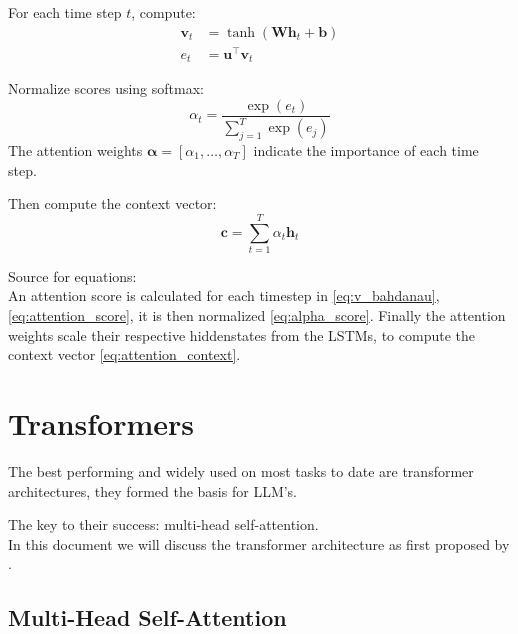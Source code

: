 \documentclass{article}
\begin{document}
For each time step $t$, compute:
\begin{align}
    \mathbf{v}_t &= \tanh\!\left( \mathbf{W} \mathbf{h}_t + \mathbf{b} \right) \label{eq:v_bahdanau} \\
    e_t &= \mathbf{u}^\top \mathbf{v}_t \label{eq:attention_score}
\end{align}

Normalize scores using softmax:
\begin{equation}
    \alpha_t = \frac{\exp(e_t)}{\sum_{j=1}^{T} \exp(e_j)} \label{eq:alpha_score}
\end{equation}
The attention weights $\boldsymbol{\alpha} = [\alpha_1, \dots, \alpha_T]$ 
indicate the importance of each time step.

Then compute the context vector:
\begin{equation}
    \mathbf{c} = \sum_{t=1}^{T} \alpha_t \mathbf{h}_t \label{eq:attention_context}
\end{equation}

Source for equations: \cite{cristina_2023_bahdanau}
\\[2em]
An attention score is calculated for each timestep in \eqref{eq:v_bahdanau}, 
\eqref{eq:attention_score}, it is then normalized \eqref{eq:alpha_score}. 
Finally the attention weights scale their respective hiddenstates from the 
LSTMs, to compute the context vector \eqref{eq:attention_context}.

\section{Transformers} \label{sec:transformers}

The best performing and widely used on most tasks to date are transformer 
architectures, they formed the basis for LLM's.

The key to their success: multi-head self-attention.
\\[2em]
In this document we will discuss the transformer architecture as first proposed 
by \cite{vaswani2023attentionneed}.
\subsection{Multi-Head Self-Attention}
\end{document}
